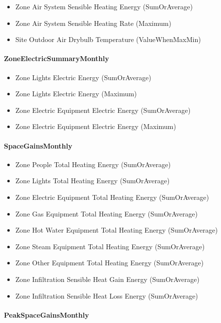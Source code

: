 \begin{itemize}
\item
  Zone Air System Sensible Heating Energy (SumOrAverage)
\item
  Zone Air System Sensible Heating Rate (Maximum)
\item
  Site Outdoor Air Drybulb Temperature (ValueWhenMaxMin)
\end{itemize}

\paragraph{ZoneElectricSummaryMonthly}\label{zoneelectricsummarymonthly}

\begin{itemize}
\item
  Zone Lights Electric Energy (SumOrAverage)
\item
  Zone Lights Electric Energy (Maximum)
\item
  Zone Electric Equipment Electric Energy (SumOrAverage)
\item
  Zone Electric Equipment Electric Energy (Maximum)
\end{itemize}

\paragraph{SpaceGainsMonthly}\label{spacegainsmonthly}

\begin{itemize}
\item
  Zone People Total Heating Energy (SumOrAverage)
\item
  Zone Lights Total Heating Energy (SumOrAverage)
\item
  Zone Electric Equipment Total Heating Energy (SumOrAverage)
\item
  Zone Gas Equipment Total Heating Energy (SumOrAverage)
\item
  Zone Hot Water Equipment Total Heating Energy (SumOrAverage)
\item
  Zone Steam Equipment Total Heating Energy (SumOrAverage)
\item
  Zone Other Equipment Total Heating Energy (SumOrAverage)
\item
  Zone Infiltration Sensible Heat Gain Energy (SumOrAverage)
\item
  Zone Infiltration Sensible Heat Loss Energy (SumOrAverage)
\end{itemize}

\paragraph{PeakSpaceGainsMonthly}\label{peakspacegainsmonthly}


